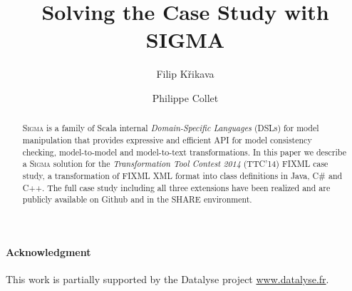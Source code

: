 \documentclass[submission]{eptcs}
\title{Solving the \TTC \FIXML Case Study with SIGMA}
\author{
  Filip Křikava
  \institute{University Lille 1 - LIFL}
  \institute{INRIA Lille, Nord Europe}
  \institute{France}
  \email{\href{mailto:filip.krikava@inria.fr}{filip.krikava@inria.fr}}
\and
  Philippe Collet
  \institute{Université Nice - Sophia Antipolis}
  \institute{CNRS, I3S, UMR 7271}
  \institute{06900 Sophia Antipolis, France}
  \email{\quad \href{mailto:philippe.collet@unice.fr}{philippe.collet@unice.fr}}
}
\newcommand{\SIGMA}{\textsc{Sigma}\xspace}
\newcommand{\TTC}{TTC'14\xspace}
\newcommand{\Csharp}{C\#\xspace}
\begin{document}
\maketitle

\begin{abstract}
\SIGMA is a family of Scala internal \emph{Domain-Specific Languages} (DSLs) for model manipulation that provides expressive and efficient API for model consistency checking, model-to-model and model-to-text transformations.
In this paper we describe a \SIGMA solution for the \emph{Transformation Tool Contest 2014} (\TTC) FIXML case study, a transformation of FIXML XML format into class definitions in Java, \Csharp and C++.
The full case study including all three extensions have been realized and are publicly available on Github and in the SHARE environment.	
\end{abstract}








\paragraph{Acknowledgment}
This work is partially supported by the Datalyse project \url{www.datalyse.fr}.


	



\end{document}
